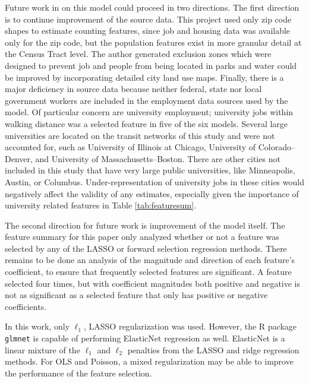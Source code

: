 \documentclass[11pt]{article}
\begin{document}
Future work in on this model could proceed in two directions. The first direction is to continue improvement of the source data. This project used only zip code shapes to estimate counting features, since job and housing data was available only for the zip code, but the population features exist in more granular detail at the Census Tract level. The author generated exclusion zones which were designed to prevent job and people from being located in parks and water could be improved by incorporating detailed city land use maps. Finally, there is a major deficiency in source data because neither federal, state nor local government workers are included in the employment data sources used by the model. Of particular concern are university employment; university jobs within walking distance was a selected feature in five of the six models. Several large universities are located on the transit networks of this study and were not accounted for, such as University of Illinois at Chicago, University of Colorado--Denver, and University of Massachusetts--Boston. There are other cities not included in this study that have very large public universities, like Minneapolis, Austin, or Columbus. Under-representation of university jobs in these cities would negatively affect the validity of any estimates, especially given the importance of university related features in Table \ref{tab:featuresum}.

The second direction for future work is improvement of the model itself. The feature summary for this paper only analyzed whether or not a feature was selected by any of the LASSO or forward selection regression methods. There remains to be done an analysis of the magnitude and direction of each feature's coefficient, to ensure that frequently selected features are significant. A feature selected four times, but with coefficient magnitudes both positive and negative is not as significant as a selected feature that only has positive or negative coefficients. 

In this work, only $\ell_1$, LASSO regularization was used. However, the R package \texttt{glmnet} is capable of performing ElasticNet regression as well. ElasticNet \cite{Zou2005} is a linear mixture of the $\ell_1$ and $\ell_2$ penalties from the LASSO and ridge regression methods. For OLS and Poisson, a mixed regularization may be able to improve the performance of the feature selection. 
\end{document}
